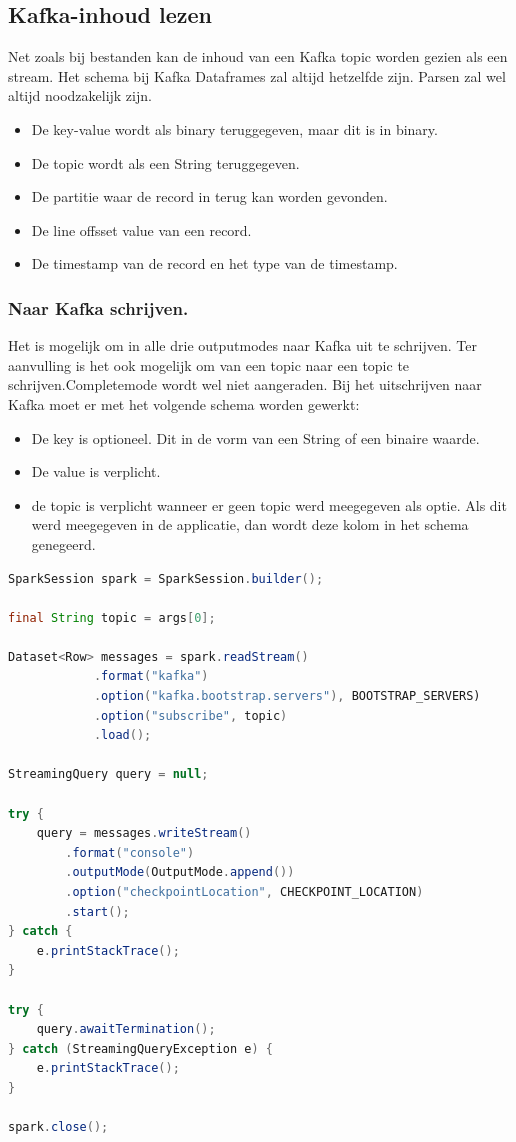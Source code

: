 \documentclass[a4paper,10pt,twoside]{report}
\begin{document}
\subsection{Kafka-inhoud lezen}

Net zoals bij bestanden kan de inhoud van een Kafka topic worden gezien als een stream. Het schema bij Kafka Dataframes zal altijd hetzelfde zijn. Parsen zal wel altijd noodzakelijk zijn.

\begin{itemize}
	\item De key-value wordt als binary teruggegeven, maar dit is in binary. 
	\item De topic wordt als een String teruggegeven.
	\item De partitie waar de record in terug kan worden gevonden.
	\item De line offsset value van een record.
	\item De timestamp van de record en het type van de timestamp.
\end{itemize} 

\subsubsection{Naar Kafka schrijven.}

Het is mogelijk om in alle drie outputmodes naar Kafka uit te schrijven. Ter aanvulling is het ook mogelijk om van een topic naar een topic te schrijven.Completemode wordt wel niet aangeraden. Bij het uitschrijven naar Kafka moet er met het volgende schema worden gewerkt:

\begin{itemize}
	\item De key is optioneel. Dit in de vorm van een String of een binaire waarde.
	\item De value is verplicht. 
	\item de topic is verplicht wanneer er geen topic werd meegegeven als optie. Als dit werd meegegeven in de applicatie, dan wordt deze kolom in het schema genegeerd.
\end{itemize}

\begin{lstlisting}[language=Java]
SparkSession spark = SparkSession.builder();

final String topic = args[0];

Dataset<Row> messages = spark.readStream()
			.format("kafka")
			.option("kafka.bootstrap.servers"), BOOTSTRAP_SERVERS)
			.option("subscribe", topic)
			.load();
			
StreamingQuery query = null;

try {
	query = messages.writeStream()
		.format("console")
		.outputMode(OutputMode.append())
		.option("checkpointLocation", CHECKPOINT_LOCATION)
		.start();
} catch {
	e.printStackTrace();
}

try {
	query.awaitTermination();
} catch (StreamingQueryException e) {
	e.printStackTrace();
}

spark.close();
\end{lstlisting}
\end{document}
